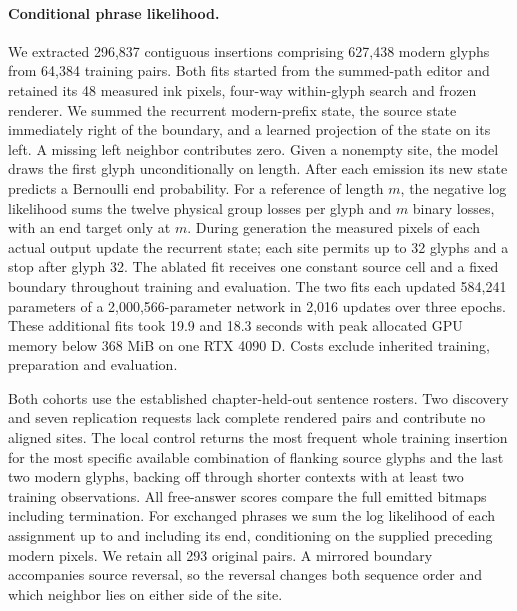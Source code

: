 \documentclass[12pt,a4paper]{article}
\providecommand{\DIFadd}[1]{{\protect\color{blue} \sf #1}} %
\begin{document}
\paragraph{\DIFadd{Conditional phrase likelihood.}}
\DIFadd{We extracted 296,837 contiguous insertions comprising 627,438 modern glyphs from 64,384 training pairs. Both fits started from the summed-path editor and retained its 48 measured ink pixels, four-way within-glyph search and frozen renderer. We summed the recurrent modern-prefix state, the source state immediately right of the boundary, and a learned projection of the state on its left. A missing left neighbor contributes zero. Given a nonempty site, the model draws the first glyph unconditionally on length. After each emission its new state predicts a Bernoulli end probability. For a reference of length $m$, the negative log likelihood sums the twelve physical group losses per glyph and $m$ binary losses, with an end target only at $m$. During generation the measured pixels of each actual output update the recurrent state; each site permits up to 32 glyphs and a stop after glyph 32. The ablated fit receives one constant source cell and a fixed boundary throughout training and evaluation. The two fits each updated 584,241 parameters of a 2,000,566-parameter network in 2,016 updates over three epochs. These additional fits took 19.9 and 18.3 seconds with peak allocated GPU memory below 368 MiB on one RTX 4090 D. Costs exclude inherited training, preparation and evaluation.
}

\DIFadd{Both cohorts use the established chapter-held-out sentence rosters. Two discovery and seven replication requests lack complete rendered pairs and contribute no aligned sites. The local control returns the most frequent whole training insertion for the most specific available combination of flanking source glyphs and the last two modern glyphs, backing off through shorter contexts with at least two training observations. All free-answer scores compare the full emitted bitmaps including termination. For exchanged phrases we sum the log likelihood of each assignment up to and including its end, conditioning on the supplied preceding modern pixels. We retain all 293 original pairs. A mirrored boundary accompanies source reversal, so the reversal changes both sequence order and which neighbor lies on either side of the site.
}
\end{document}
